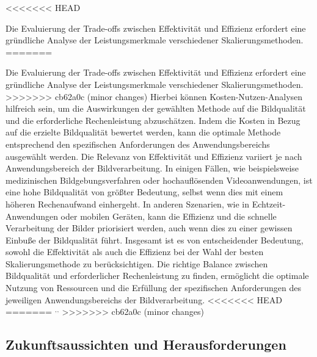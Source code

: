 <<<<<<< HEAD

        Die Evaluierung der Trade-offs zwischen Effektivität und Effizienz erfordert eine gründliche Analyse der Leistungsmerkmale verschiedener Skalierungsmethoden.
=======
        
        Die Evaluierung der Trade-offs zwischen Effektivität und Effizienz erfordert eine gründliche Analyse der Leistungsmerkmale verschiedener Skalierungsmethoden. 
>>>>>>> cb62a0c (minor changes)
        Hierbei können Kosten-Nutzen-Analysen hilfreich sein, um die Auswirkungen der gewählten Methode auf die Bildqualität und die erforderliche Rechenleistung abzuschätzen. 
        Indem die Kosten in Bezug auf die erzielte Bildqualität bewertet werden, kann die optimale Methode entsprechend den spezifischen Anforderungen des Anwendungsbereichs ausgewählt werden.
        Die Relevanz von Effektivität und Effizienz variiert je nach Anwendungsbereich der Bildverarbeitung. 
        In einigen Fällen, wie beispielsweise medizinischen Bildgebungsverfahren oder hochauflösenden Videoanwendungen, ist eine hohe Bildqualität von größter Bedeutung, selbst wenn dies mit einem höheren Rechenaufwand einhergeht. 
        In anderen Szenarien, wie in Echtzeit-Anwendungen oder mobilen Geräten, kann die Effizienz und die schnelle Verarbeitung der Bilder priorisiert werden, auch wenn dies zu einer gewissen Einbuße der Bildqualität führt.
        Insgesamt ist es von entscheidender Bedeutung, sowohl die Effektivität als auch die Effizienz bei der Wahl der besten Skalierungsmethode zu berücksichtigen. 
        Die richtige Balance zwischen Bildqualität und erforderlicher Rechenleistung zu finden, ermöglicht die optimale Nutzung von Ressourcen und die Erfüllung der spezifischen Anforderungen des jeweiligen Anwendungsbereichs der Bildverarbeitung.
<<<<<<< HEAD
=======
        $^{,}$$^{,}$
>>>>>>> cb62a0c (minor changes)

    \subsection{Zukunftsaussichten und Herausforderungen}
    
